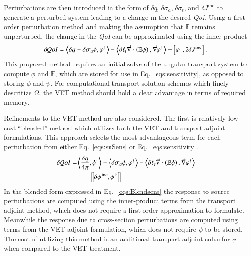 \documentclass{anstrans}
\newcommand{\bra}{\left\langle}
\newcommand{\ket}{\right\rangle}
\newcommand{\sbraSN}{\left[ \! \left[}
\newcommand{\sketSN}{\right] \! \right]}
\newcommand{\sbra}{\left[}
\newcommand{\sket}{\right]}
\renewcommand{\div}{\vec{\nabla} \cdot}
\newcommand{\grad}{\vec{\nabla}}
\newcommand{\vefadj}{\varphi^\dag}
\newcommand{\Edd}{\mathbb{E}}
\newcommand{\sigt}{\sigma_t}
\newcommand{\siga}{\sigma_a}
\newcommand{\isigt}{\ell_t}
\newcommand{\angSourced}{\frac{\delta q}{4 \pi}}
\newcommand{\scalSource}{q}
\newcommand{\qoi}{{\it QoI}\xspace}
\begin{document}
Perturbations are then introduced in the form of $\delta q$, $\delta \siga$, $\delta \sigt$, and $\delta J^{\text{inc}}$ to generate a perturbed system leading to a change in the desired \qoi. Using a first-order perturbation method and making the assumption that $\Edd$ remains unperturbed, the change in the \qoi can be approximated using the inner product
\begin{equation}\label{eqs:sensitivity}
\delta \qoi =  \bra \delta \scalSource - \delta \siga \phi, \vefadj \ket  - \bra \delta \isigt \div \left( \Edd \phi \right) , \grad \vefadj \ket
 + \sbra \vefadj, 2 \delta J^{\text{inc}} \sket \,.
\end{equation}
This proposed method requires an initial solve of the angular transport system to compute $\phi$ and $\Edd$, which are stored for use in Eq.~\eqref{eqs:sensitivity}, as opposed to storing $\phi$ and $\psi$. For computational transport solution schemes which finely descritize $\Omega$, the VET method should hold a clear advantage in terms of required memory. 

Refinements to the VET method are also considered. The first is relatively low cost ``blended'' method which utilizes both the VET and transport adjoint formulations. This approach selects the most advantageous term for each perturbation from either Eq.~\eqref{eqs:snSens} or Eq.~\eqref{eqs:sensitivity}.  
\begin{equation}
\label{eqs:Blendsens}
\begin{split}
\delta \qoi =&  \bra \angSourced , \phi^\dag \ket - \bra \delta \siga \phi, \vefadj \ket - \bra \delta \isigt \div \left( \Edd \phi \right) , \grad \vefadj \ket\\
&\quad - \sbraSN \delta \psi^\text{inc}, \psi^\dag \sketSN \\
\end{split}
\end{equation}
In the blended form expressed in Eq.~\eqref{eqs:Blendsens} the response to source perturbations are computed using the inner-product terms from the transport adjoint method, which does not require a first order approximation to formulate. Meanwhile the response due to cross-section perturbations are computed using terms from the VET adjoint formulation, which does not require $\psi$ to be stored. The cost of utilizing this method is an additional transport adjoint solve for $\phi^\dag$ when compared to the VET treatment.
\end{document}
